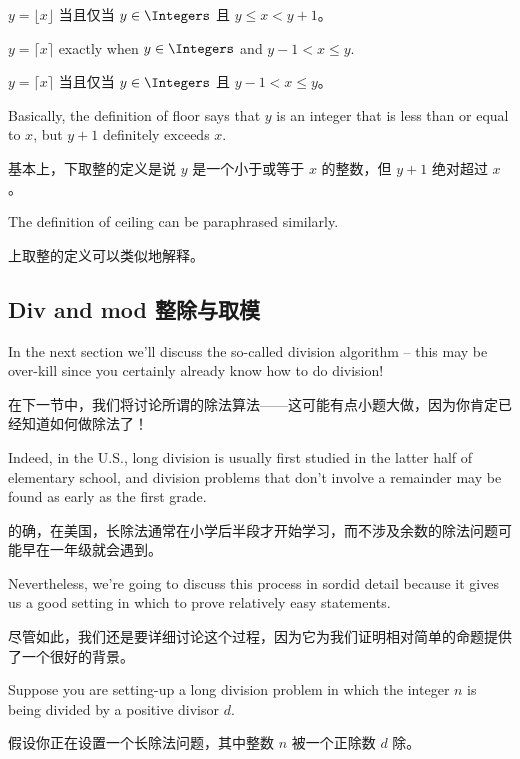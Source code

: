 \begin{defi}
$y = \lfloor x \rfloor$ 当且仅当 $y \in \Integers$ 且 $y \leq x < y+1$。
\end{defi}

\begin{defi}
$y = \lceil x \rceil$ exactly when $y \in \Integers$ and 
$y-1 < x \leq y$.
\end{defi}

\begin{defi}
$y = \lceil x \rceil$ 当且仅当 $y \in \Integers$ 且 $y-1 < x \leq y$。
\end{defi}

Basically, the definition of floor says that $y$ is an integer
that is less than or equal to $x$, but $y+1$ definitely exceeds $x$.

基本上，下取整的定义是说 $y$ 是一个小于或等于 $x$ 的整数，但 $y+1$ 绝对超过 $x$。

The definition of ceiling can be paraphrased similarly.

上取整的定义可以类似地解释。


\subsection{Div and mod 整除与取模}
\label{div/mod}

In the next section we'll discuss the so-called division algorithm --
this may be over-kill since you certainly already know how to do
division!

在下一节中，我们将讨论所谓的除法算法——这可能有点小题大做，因为你肯定已经知道如何做除法了！

Indeed, in the U.S., long division is usually first studied
in the latter half of elementary school, and division problems that
don't involve a remainder may be found as early as the first grade.

的确，在美国，长除法通常在小学后半段才开始学习，而不涉及余数的除法问题可能早在一年级就会遇到。

Nevertheless, we're going to discuss this process in sordid detail
because it gives us a good setting in which to prove relatively easy
statements.

尽管如此，我们还是要详细讨论这个过程，因为它为我们证明相对简单的命题提供了一个很好的背景。

Suppose you are setting-up a long division problem in
which the integer $n$ is being divided by a positive divisor $d$.

假设你正在设置一个长除法问题，其中整数 $n$ 被一个正除数 $d$ 除。

